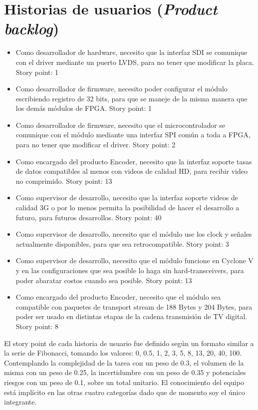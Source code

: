 \documentclass[11pt]{charter}
\begin{document}
\section{Historias de usuarios (\textit{Product backlog})}
\label{sec:backlog}


\begin{itemize}
\item Como desarrollador de hardware, necesito que la interfaz SDI se comunique con el driver mediante un puerto LVDS, para no tener que modificar la placa. Story point: 1
\item Como desarrollador de firmware, necesito poder configurar el módulo escribiendo registro de 32 bits, para que se maneje de la misma manera que los demás módulos de FPGA. Story point: 1
\item Como desarrollador de firmware, necesito que el microcontrolador se comunique con el módulo mediante una interfaz SPI común a toda a FPGA, para no tener que modificar el driver. Story point: 2
\item Como encargado del producto Encoder, necesito que la interfaz soporte tasas de datos compatibles al menos con videos de calidad HD, para recibir video no comprimido. Story point: 13
\item Como supervisor de desarrollo, necesito que la interfaz soporte videos de calidad 3G o por lo menos permita la posibilidad de hacer el desarrollo a futuro, para futuros desarrollos. Story point: 40
\item Como supervisor de desarrollo, necesito que el módulo use los clock y señales actualmente disponibles, para que sea retrocompatible. Story point: 3
\item Como supervisor de desarrollo, necesito que el módulo funcione en Cyclone V y en las configuraciones que sea posible lo haga sin hard-transceivers, para poder abaratar costos cuando sea posible. Story point: 13
\item Como encargado del producto Encoder, necesito que el módulo sea compatible con paquetes de transport stream de 188 Bytes y 204 Bytes, para poder ser usado en distintas etapas de la cadena transmisión de TV digital. Story point: 8
\end{itemize}

El story point de cada historia de usuario fue definido según un formato similar a la serie de Fibonacci, tomando los valores: 0, 0.5, 1, 2, 3, 5, 8, 13, 20, 40, 100. Contemplando la complejidad de la tarea con un peso de 0.3, el volumen de la misma con un peso de 0.25, la incertidumbre con un peso de 0.35 y potenciales riesgos con un peso de 0.1, sobre un total unitario. El conocimiento del equipo está implícito en las otras cuatro categorías dado que de momento soy el único integrante.
\end{document}
